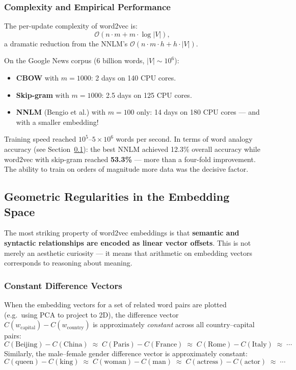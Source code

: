\documentclass[11pt,a4paper]{article}
\begin{document}
\subsubsection{Complexity and Empirical Performance}

The per-update complexity of word2vec is:
\[
  \mathcal{O}(n \cdot m + m \cdot \log|V|),
\]
a dramatic reduction from the NNLM's $\mathcal{O}(n \cdot m \cdot h + h \cdot |V|)$.

On the Google News corpus (6 billion words, $|V| \sim 10^6$):
\begin{itemize}
  \item \textbf{CBOW} with $m = 1000$: 2 days on 140 CPU cores.
  \item \textbf{Skip-gram} with $m = 1000$: 2.5 days on 125 CPU cores.
  \item \textbf{NNLM} (Bengio et al.) with $m = 100$ only: 14 days on 180 CPU cores — and with a smaller embedding!
\end{itemize}

Training speed reached $10^5$--$5\times 10^6$ words per second. In terms of word analogy accuracy (see Section~\ref{sec:we_analogies}): the best NNLM achieved 12.3\% overall accuracy while word2vec with skip-gram reached \textbf{53.3\%} — more than a four-fold improvement. The ability to train on orders of magnitude more data was the decisive factor.

\subsection{Geometric Regularities in the Embedding Space}
\label{sec:we_analogies}

The most striking property of word2vec embeddings is that \textbf{semantic and syntactic relationships are encoded as linear vector offsets}. This is not merely an aesthetic curiosity — it means that arithmetic on embedding vectors corresponds to reasoning about meaning.

\subsubsection{Constant Difference Vectors}

When the embedding vectors for a set of related word pairs are plotted (e.g.\ using PCA to project to 2D), the difference vector $C(w_{\text{capital}}) - C(w_{\text{country}})$ is approximately \emph{constant} across all country--capital pairs:
\[
  C(\text{Beijing}) - C(\text{China}) \;\approx\; C(\text{Paris}) - C(\text{France}) \;\approx\; C(\text{Rome}) - C(\text{Italy}) \;\approx\; \cdots
\]
Similarly, the male--female gender difference vector is approximately constant:
\[
  C(\text{queen}) - C(\text{king}) \;\approx\; C(\text{woman}) - C(\text{man}) \;\approx\; C(\text{actress}) - C(\text{actor}) \;\approx\; \cdots
\]
\end{document}

